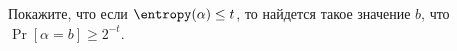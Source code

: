 Покажите, что если $\entropy(\alpha) \le t$, то найдется такое значение $b$, что
$\Pr[\alpha = b] \ge 2^{-t}$.
